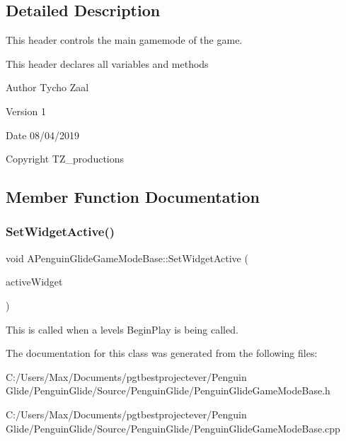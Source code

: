 \subsection{Detailed Description}
This header controls the main gamemode of the game. 

This header declares all variables and methods \begin{DoxyAuthor}{Author}
Tycho Zaal 
\end{DoxyAuthor}
\begin{DoxyVersion}{Version}
1 
\end{DoxyVersion}
\begin{DoxyDate}{Date}
08/04/2019 
\end{DoxyDate}
\begin{DoxyCopyright}{Copyright}
T\+Z\+\_\+productions 
\end{DoxyCopyright}


\subsection{Member Function Documentation}
\mbox{\label{class_a_penguin_glide_game_mode_base_ae81f88494076351c5d18b08a8854242f}} 
\subsubsection{\texorpdfstring{SetWidgetActive()}{SetWidgetActive()}}
{\footnotesize\ttfamily void A\+Penguin\+Glide\+Game\+Mode\+Base\+::\+Set\+Widget\+Active (\begin{DoxyParamCaption}\item[{T\+Subclass\+Of$<$ class U\+User\+Widget $>$}]{active\+Widget }\end{DoxyParamCaption})\hspace{0.3cm}{\ttfamily [protected]}}



This is called when a level\textquotesingle{}s Begin\+Play is being called. 



The documentation for this class was generated from the following files\+:\begin{DoxyCompactItemize}
\item 
C\+:/\+Users/\+Max/\+Documents/pgtbestprojectever/\+Penguin Glide/\+Penguin\+Glide/\+Source/\+Penguin\+Glide/Penguin\+Glide\+Game\+Mode\+Base.\+h\item 
C\+:/\+Users/\+Max/\+Documents/pgtbestprojectever/\+Penguin Glide/\+Penguin\+Glide/\+Source/\+Penguin\+Glide/Penguin\+Glide\+Game\+Mode\+Base.\+cpp\end{DoxyCompactItemize}
